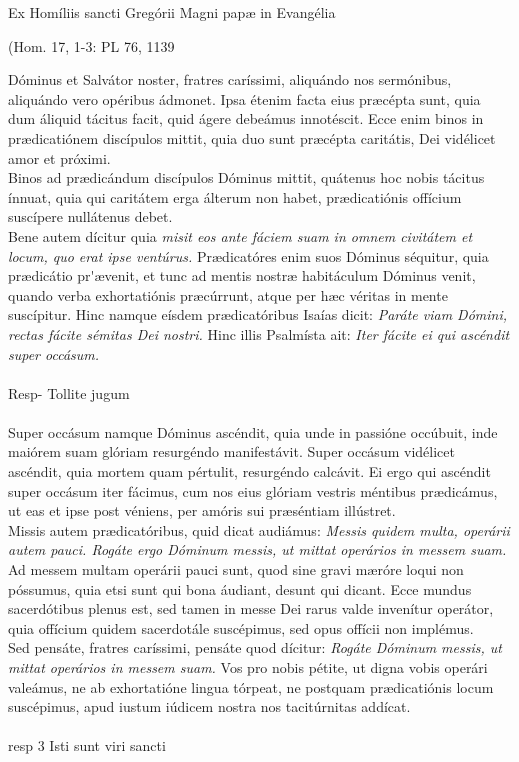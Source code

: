 \documentclass[options]{article}
\begin{document}
	Ex Homíliis sancti Gregórii Magni papæ in Evangélia 
	\begin{flushright}
		(Hom. 17, 1-3: PL 76, 1139
	\end{flushright}
Dóminus et Salvátor noster, fratres caríssimi, aliquándo nos sermónibus, aliquándo vero opéribus ádmonet. Ipsa étenim facta eius præcépta sunt, quia dum áliquid tácitus facit, quid ágere debeámus innotéscit. Ecce enim binos in prædicatiónem discípulos mittit, quia duo sunt præcépta caritátis, Dei vidélicet amor et próximi.\\
Binos ad prædicándum discípulos Dóminus mittit, quátenus hoc nobis tácitus ínnuat, quia qui caritátem erga álterum non habet, prædicatiónis offícium suscípere nullátenus debet.\\
  Bene autem dícitur quia 
  \emph{misit eos ante fáciem suam in omnem civitátem et locum, quo erat ipse ventúrus.}
Prædicatóres enim suos Dóminus séquitur, quia prædicátio pr\'{}ævenit, et tunc ad mentis nostræ habitáculum Dóminus venit, quando verba exhortatiónis præcúrrunt, atque per hæc véritas in mente suscípitur. Hinc namque eísdem prædicatóribus Isaías dicit: 
  \emph{Paráte viam Dómini, rectas fácite sémitas Dei nostri.}
   Hinc illis Psalmísta ait:
   \emph{Iter fácite ei qui ascéndit super occásum.}\\
 \\
 Resp-  Tollite jugum\\
 \\
  Super occásum namque Dóminus ascéndit, quia unde in passióne occúbuit, inde maiórem suam glóriam resurgéndo manifestávit. Super occásum vidélicet ascéndit, quia mortem quam pértulit, resurgéndo calcávit. Ei ergo qui ascéndit super occásum iter fácimus, cum nos eius glóriam vestris méntibus prædicámus, ut eas et ipse post véniens, per amóris sui præséntiam illústret.\\
 Missis autem prædicatóribus, quid dicat audiámus: 
 \emph{Messis quidem multa, operárii autem pauci. Rogáte ergo Dóminum messis, ut mittat operários in messem suam.}
 Ad messem multam operárii pauci sunt, quod sine gravi mæróre loqui non póssumus, quia etsi sunt qui bona áudiant, desunt qui dicant. Ecce mundus sacerdótibus plenus est, sed tamen in messe Dei rarus valde invenítur operátor, quia offícium quidem sacerdotále suscépimus, sed opus offícii non implémus.\\
 Sed pensáte, fratres caríssimi, pensáte quod dícitur:
 \emph{Rogáte Dóminum messis, ut mittat operários in messem suam.}
 Vos pro nobis pétite, ut digna vobis operári valeámus, ne ab exhortatióne lingua tórpeat, ne postquam prædicatiónis locum suscépimus, apud iustum iúdicem nostra nos tacitúrnitas addícat.\\
 \\
 resp 3 Isti sunt viri sancti
\end{document}

